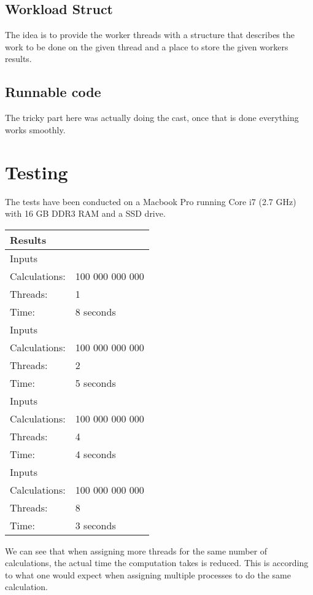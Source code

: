 \subsection{Workload Struct}
The idea is to provide the worker threads with a structure that describes the work to be done on the given thread and a place to store the given workers results.



\subsection{Runnable code}
The tricky part here was actually doing the cast, once that is done everything works smoothly.




\section{Testing}
The tests have been conducted on a Macbook Pro running Core i7 (2.7 GHz) with 16 GB DDR3 RAM and a SSD drive.


\newcommand{\rowhead}[1] {
\multicolumn{2}{l}{#1}\\
\hline
}

\newcommand{\row}[3] {
\hline
\rowcolor{gr1}
Inputs&\\
\hline \hline
\rowcolor{gr2}
Calculations: & #1 \\
\hline
\rowcolor{gr2}
Threads: & #2 \\
\hline
\rowcolor{gr2}
Time: & #3 \\
\hline \hline
}

\newcommand{\botrow}[3] {
\hline
\rowcolor{gr1}
Inputs&\\
\hline \hline
\rowcolor{gr2}
N = & #1 \\
\hline
\rowcolor{gr2}
Threads: & #2 \\
\hline
\rowcolor{gr2}
Time: & #3 \\
\hline
}

\begin{table}[ht]
\begin{tabular}{| p{} | p{} |}
\rowhead{Results}
\row{100 000 000 000}{1}{8 seconds}
\row{100 000 000 000}{2}{5 seconds}
\row{100 000 000 000}{4}{4 seconds}
\row{100 000 000 000}{8}{3 seconds}
\end{tabular}
\end{table}

We can see that when assigning more threads for the same number of calculations, the actual time the computation takes is reduced.
This is according to what one would expect when assigning multiple processes to do the same calculation.